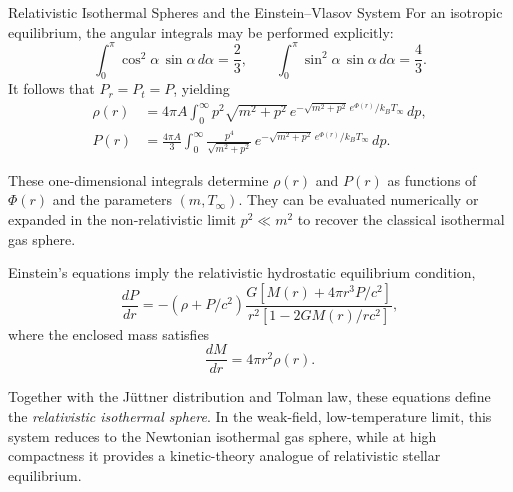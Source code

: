 \documentclass[12pt,a4paper]{article}
\numberwithin{equation}{section}
\begin{document}
\begin{section}{Relativistic Isothermal Spheres and the Einstein--Vlasov System}
For an isotropic equilibrium, the angular integrals may be performed explicitly:
\begin{equation}
\int_0^\pi \cos^2\alpha \, \sin\alpha \, d\alpha = \frac{2}{3},
\qquad
\int_0^\pi \sin^2\alpha \, \sin\alpha \, d\alpha = \frac{4}{3}.
\end{equation}
It follows that $P_r = P_t = P$, yielding
\begin{align}
\rho(r) &= 4\pi A \int_0^\infty
p^2 \sqrt{m^2 + p^2} \,
e^{ - \sqrt{m^2 + p^2}\, e^{\Phi(r)} / k_B T_\infty } \, dp, \\
P(r) &= \frac{4\pi A}{3} \int_0^\infty
\frac{p^4}{\sqrt{m^2 + p^2}} \,
e^{ - \sqrt{m^2 + p^2}\, e^{\Phi(r)} / k_B T_\infty } \, dp.
\end{align}

These one-dimensional integrals determine $\rho(r)$ and $P(r)$ as functions of $\Phi(r)$ and the parameters $(m, T_\infty)$. They can be evaluated numerically or expanded in the non-relativistic limit $p^2 \ll m^2$ to recover the classical isothermal gas sphere.

Einstein’s equations imply the relativistic hydrostatic equilibrium condition,
\begin{equation}
\frac{dP}{dr} =
 - (\rho + P/c^2)
 \frac{G [M(r) + 4\pi r^3 P/c^2]}
      {r^2 [1 - 2GM(r)/r c^2]},
\end{equation}
where the enclosed mass satisfies
\begin{equation}
\frac{dM}{dr} = 4\pi r^2 \rho(r).
\end{equation}

Together with the Jüttner distribution and Tolman law, these equations define the \emph{relativistic isothermal sphere}. In the weak-field, low-temperature limit, this system reduces to the Newtonian isothermal gas sphere, while at high compactness it provides a kinetic-theory analogue of relativistic stellar equilibrium.

\end{section}
\end{document}
